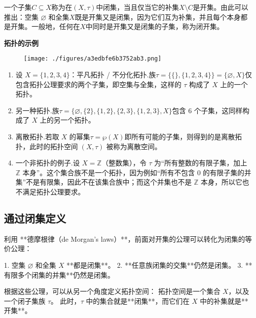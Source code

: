 一个子集$C \subseteq X$称为在$(X, \tau)$中闭集，当且仅当它的补集$X \setminus C$是开集。由此可以推出：空集 $\varnothing$ 和全集$X$既是开集又是闭集，因为它们互为补集，并且每个本身都是开集。一般地，任何在$X$中同时是开集又是闭集的子集，称为闭开集。

\textbf{拓扑的示例}
\begin{figure}[ht]
\centering
\texttt{[image: ./figures/a3edbfe6b3752ab3.png]}
\caption{} \label{fig_TPKJ_1}
\end{figure}
\begin{enumerate}
\item 设 $X = \{1, 2, 3, 4\}$：平凡拓扑 / 不分化拓扑.族$\tau = \{\{\}, \{1, 2, 3, 4\}\} = \{\varnothing, X\}$仅包含拓扑公理要求的两个子集，即空集与全集，这样的 $\tau$ 构成了 $X$ 上的一个拓扑。
\item 另一种拓扑.族$\tau = \{\varnothing, \{2\}, \{1, 2\}, \{2, 3\}, \{1, 2, 3\}, X\}$包含 6 个子集，这同样构成了 $X$ 上的另一个拓扑。
\item 离散拓扑.若取 $X$ 的幂集$\tau = \wp(X)$即所有可能的子集，则得到的是离散拓扑，此时的拓扑空间 $(X, \tau)$ 被称为离散空间。
\item 一个非拓扑的例子.设 $X = \mathbb{Z}$（整数集），令 $\tau$ 为“所有整数的有限子集，加上 $\mathbb{Z}$ 本身”。这个集合族不是一个拓扑，因为例如“所有不包含 0 的有限子集的并集”不是有限集，因此不在该集合族中；而这个并集也不是 $\mathbb{Z}$ 本身，所以它也不满足拓扑公理要求。
\end{enumerate}
\subsection{通过闭集定义}

利用 **德摩根律（de Morgan's laws）**，前面对开集的公理可以转化为闭集的等价公理：

1. 空集 $\varnothing$ 和全集 $X$ **都是闭集**。
2. **任意族闭集的交集**仍然是闭集。
3. **有限多个闭集的并集**仍然是闭集。

根据这些公理，可以从另一个角度定义拓扑空间：
拓扑空间是一个集合 $X$，以及一个闭子集族 $\tau$。
此时，$\tau$ 中的集合就是**闭集**，而它们在 $X$ 中的补集就是**开集**。
